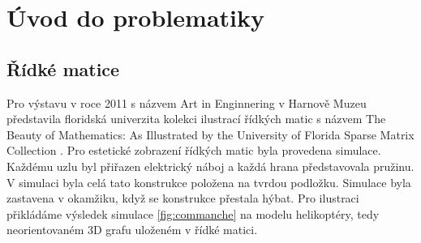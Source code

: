 \chapter{Úvod do problematiky}

\section{Řídké matice}


Pro výstavu v roce 2011 s názvem Art in Enginnering v Harnově Muzeu představila floridská univerzita kolekci ilustrací řídkých matic s názvem The Beauty of Mathematics: As Illustrated by the University of Florida Sparse Matrix Collection \cite{Davis:2011:UFS:2049662.2049663}. Pro estetické zobrazení řídkých matic byla provedena simulace\cite{simul}. Každému uzlu byl přiřazen elektrický náboj a každá hrana představovala pružinu. V simulaci byla celá tato konstrukce položena na tvrdou podložku. Simulace byla zastavena v okamžiku, když se konstrukce přestala hýbat. Pro ilustraci přikládáme výsledek simulace \ref{fig:commanche} na modelu helikoptéry, tedy neorientovaném 3D grafu uloženém v řídké matici.

